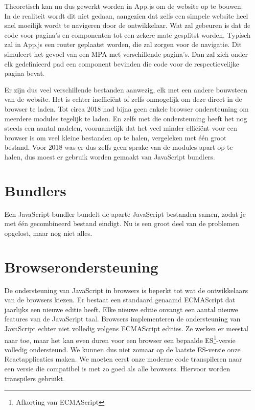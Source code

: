 Theoretisch kan nu dus gewerkt worden in App.js om de website op te bouwen. In de realiteit wordt dit niet gedaan, aangezien dat zelfs een simpele website heel snel moeilijk wordt te navigeren door de ontwikkelaar. Wat zal gebeuren is dat de code voor pagina's en componenten tot een zekere mate gesplitst worden. Typisch zal in App.js een router geplaatst worden, die zal zorgen voor de navigatie. Dit simuleert het gevoel van een MPA met verschillende pagina's. Dan zal zich onder elk gedefinieerd pad een component bevinden die code voor de respectievelijke pagina bevat.

Er zijn dus veel verschillende bestanden aanwezig, elk met een andere bouwsteen van de website. Het is echter inefficiënt of zelfs onmogelijk om deze direct in de browser te laden. Tot circa 2018 had bijna geen enkele browser ondersteuning om meerdere modules tegelijk te laden. En zelfs met die ondersteuning heeft het nog steeds een aantal nadelen, voornamelijk dat het veel minder efficiënt voor een browser is om veel kleine bestanden op te halen, vergeleken met één groot bestand. Voor 2018 was er dus zelfs geen sprake van de modules apart op te halen, dus moest er gebruik worden gemaakt van JavaScript bundlers.

\section{Bundlers}

Een JavaScript bundler bundelt de aparte JavaScript bestanden samen, zodat je met één gecombineerd bestand eindigt. Nu is een groot deel van de problemen opgelost, maar nog niet alles.

\section{Browserondersteuning}

De ondersteuning van JavaScript in browsers is beperkt tot wat de ontwikkelaars van de browsers kiezen. Er bestaat een standaard genaamd ECMAScript dat jaarlijks een nieuwe editie heeft. Elke nieuwe editie onvangt een aantal nieuwe features van de JavaScript taal. Browsers implementeren de ondersteuning van JavaScript echter niet volledig volgens ECMAScript edities. Ze werken er meestal naar toe, maar het kan even duren voor een browser een bepaalde ES\footnote{Afkorting van ECMAScript}-versie volledig ondersteund. We kunnen dus niet zomaar op de laatste ES-versie onze Reactapplicaties maken. We moeten eerst onze moderne code transpileren naar een versie die compatibel is met zo goed als alle browsers. Hiervoor worden transpilers gebruikt.

